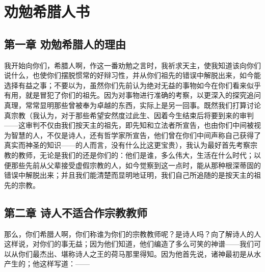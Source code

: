 
\chapter{劝勉希腊人书}



\section{第一章 劝勉希腊人的理由}

我开始向你们，希腊人啊，作这一番劝勉之言时，我祈求天主，使我知道该向你们说什么，也使你们摆脱惯常的好辩习性，并从你们祖先的错误中解脱出来，如今能选择有益之事；不要以为，虽然你们先前认为绝对无益的事物如今在你们看来似乎有用，就是冒犯了你们的祖先。因为对事物进行准确的考察，以更深入的探究追问真理，常常显明那些曾被奉为卓越的东西，实际上是另一回事。既然我们打算讨论真宗教（我认为，对于那些希望安然度过此生、因着今生结束后将要到来的审判——这审判不仅由我们按天主的祖先，即先知和立法者所宣告，也由你们中间被视为智慧的人，不仅是诗人，还有哲学家所宣告，他们曾在你们中间声称自己获得了真实而神圣的知识——的人而言，没有什么比这更宝贵），我认为最好首先考察宗教的教师，无论是我们的还是你们的：他们是谁，多么伟大，生活在什么时代；以便那些先前从父辈接受虚假宗教的人，如今觉察到这一点时，能从那种根深蒂固的错误中解脱出来；并且我们能清楚而显明地证明，我们自己所追随的是按天主的祖先的宗教。\par


\section{第二章 诗人不适合作宗教教师}

那么，你们希腊人啊，你们称谁为你们的宗教教师呢？是诗人吗？向了解诗人的人这样说，对你们的事无益；因为他们知道，他们编造了多么可笑的神谱——我们可以从你们最杰出、堪称诗人之王的荷马那里得知。因为他首先说，诸神最初是从水产生的；他这样写道：——\par

\par

